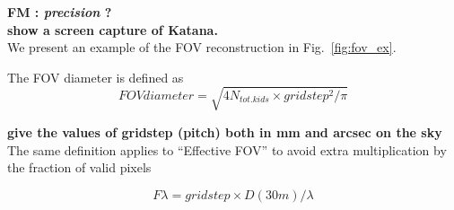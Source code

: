 {\bf FM : {\it precision} ? }\\
{\bf show a screen capture of Katana.}\\

We present an example of the FOV reconstruction in Fig.~\ref{fig:fov_ex}.

The FOV diameter is defined as 
\begin{equation}
FOV diameter = \sqrt{4 N_{tot. kids} \times gridstep^2/\pi}
\end{equation}

{\bf give the values of gridstep (pitch) both in mm and arcsec on the sky}\\

The same definition applies to ``Effective FOV'' to avoid extra multiplication
by the fraction of valid pixels

\begin{equation}
F\lambda = gridstep\times D(30m)/\lambda
\end{equation}
